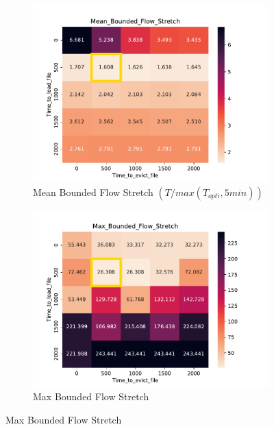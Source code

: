 \documentclass[a4paper]{article}
\begin{document}
\begin{figure}[H]
\begin{subfigure}[b]{0.4\linewidth}\centering\includegraphics[width=1\linewidth]{MBSS/plot/Heatmap_Stretch_with_a_minimum_FCFS_Score_Time_to_load_file_Time_to_evict_file_2022-01-24->2022-01-24_450_128_32_256_4_1024.pdf}\caption{Mean Bounded Flow Stretch $(T/max(T_{opti}, 5min))$}\end{subfigure}
\begin{subfigure}[b]{0.4\linewidth}\centering\includegraphics[width=1\linewidth]{MBSS/plot/Heatmap_Max_Stretch_with_a_minimum_FCFS_Score_Time_to_load_file_Time_to_evict_file_2022-01-24->2022-01-24_450_128_32_256_4_1024.pdf}\caption{Max Bounded Flow Stretch}\end{subfigure}

\end{figure}
\end{document}
